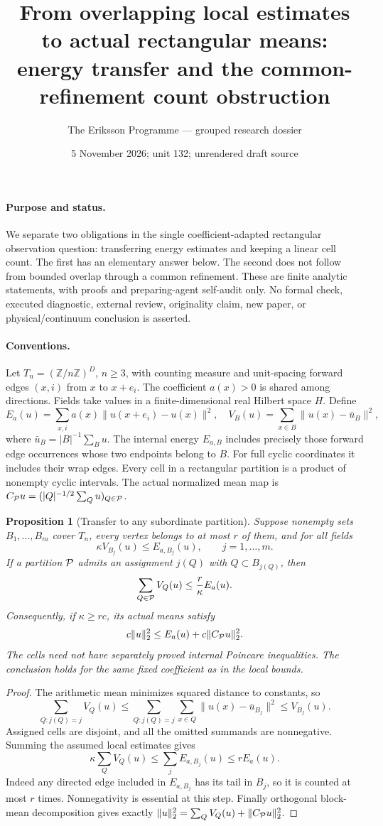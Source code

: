 \documentclass[11pt]{article}
\title{From overlapping local estimates to actual rectangular means:
energy transfer and the common-refinement count obstruction}
\author{The Eriksson Programme --- grouped research dossier}
\date{5 November 2026; unit 132; unrendered draft source}
\newtheorem{proposition}{Proposition}
\begin{document}
\maketitle
\paragraph{Purpose and status.}
We separate two obligations in the single coefficient-adapted rectangular
observation question: transferring energy estimates and keeping a linear
cell count. The first has an elementary answer below. The second does not
follow from bounded overlap through a common refinement. These are finite
analytic statements, with proofs and preparing-agent self-audit only. No
formal check, executed diagnostic, external review, originality claim,
new paper, or physical/continuum conclusion is asserted.

\paragraph{Conventions.}
Let $T_n=(\mathbb Z/n\mathbb Z)^D$, $n\ge3$, with counting measure and
unit-spacing forward edges $(x,i)$ from $x$ to $x+e_i$. The coefficient
$a(x)>0$ is shared among directions. Fields take values in a finite-dimensional
real Hilbert space $H$. Define
\[
 E_a(u)=\sum_{x,i}a(x)\|u(x+e_i)-u(x)\|^2,
 \quad V_B(u)=\sum_{x\in B}\|u(x)-\bar u_B\|^2,
\]
where $\bar u_B=|B|^{-1}\sum_Bu$. The internal energy $E_{a,B}$ includes
precisely those forward edge occurrences whose two endpoints belong to $B$.
For full cyclic coordinates it includes their wrap edges. Every cell in a
rectangular partition is a product of nonempty cyclic intervals. The actual
normalized mean map is $C_{\cal P}u=(|Q|^{-1/2}\sum_Qu)_{Q\in\cal P}$.

\begin{proposition}[Transfer to any subordinate partition]
Suppose nonempty sets $B_1,\ldots,B_m$ cover $T_n$, every vertex belongs to
at most $r$ of them, and for all fields
\[
 \kappa V_{B_j}(u)\le E_{a,B_j}(u),\qquad j=1,\ldots,m.
\]
If a partition $\cal P$ admits an assignment $j(Q)$ with $Q\subset B_{j(Q)}$,
then
\[
 \sum_{Q\in\cal P} V_Q(u)\le\frac r\kappa E_a(u).
\]
Consequently, if $\kappa\ge rc$, its actual means satisfy
\[
 c\|u\|_2^2\le E_a(u)+c\|C_{\cal P}u\|_2^2.
\]
The cells need not have separately proved internal Poincare inequalities.
The conclusion holds for the same fixed coefficient as in the local bounds.
\end{proposition}
\begin{proof}
The arithmetic mean minimizes squared distance to constants, so
\[
 \sum_{Q:j(Q)=j}V_Q(u)
 \le\sum_{Q:j(Q)=j}\sum_{x\in Q}\|u(x)-\bar u_{B_j}\|^2
 \le V_{B_j}(u).
\]
Assigned cells are disjoint, and all the omitted summands are nonnegative.
Summing the assumed local estimates gives
\[
 \kappa\sum_QV_Q(u)\le\sum_jE_{a,B_j}(u)\le rE_a(u).
\]
Indeed any directed edge included in $E_{a,B_j}$ has its tail in $B_j$,
so it is counted at most $r$ times. Nonnegativity is essential at this step.
Finally orthogonal block-mean decomposition gives exactly
$\|u\|_2^2=\sum_QV_Q(u)+\|C_{\cal P}u\|_2^2$.
\end{proof}
\end{document}
